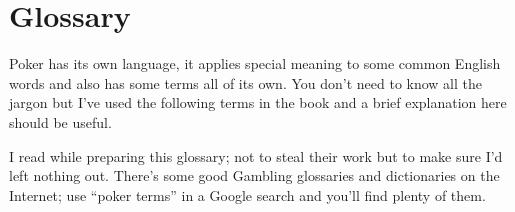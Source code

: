 \chapter{Glossary}



Poker has its own language, it applies special meaning to some
common English words and also has some terms all of its own. You
don't need to know all the jargon but I've used the following terms
in the book and a brief explanation here should be useful.

I read \citep{AllanMackay} while preparing this glossary; not to steal
their work but to make sure I'd left nothing out. There's some good
Gambling glossaries and dictionaries on the Internet; use ``poker
terms'' in a Google search and you'll find plenty of them.

